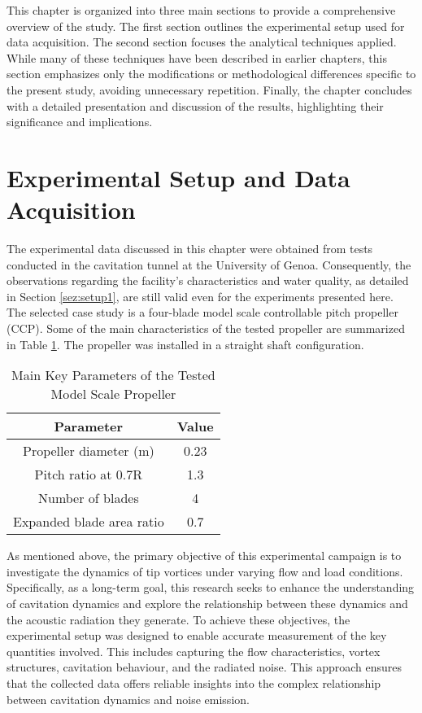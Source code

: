 This chapter is organized into three main sections to provide a comprehensive overview of the study. The first section outlines the experimental setup used for data acquisition. The second section focuses the analytical techniques applied. While many of these techniques have been described in earlier chapters, this section emphasizes only the modifications or methodological differences specific to the present study, avoiding unnecessary repetition. Finally, the chapter concludes with a detailed presentation and discussion of the results, highlighting their significance and implications.

\section{Experimental Setup and Data Acquisition}
\label{sez:setup2}

The experimental data discussed in this chapter were obtained from tests conducted in the cavitation tunnel at the University of Genoa. Consequently, the observations regarding the facility's characteristics and water quality, as detailed in Section \ref{sez:setup1}, are still valid even for the experiments presented here.
The selected case study is a four-blade model scale controllable pitch propeller (CCP). Some of the main characteristics of the tested propeller are summarized in Table \ref{tab:caseStudyFeatures}.
The propeller was installed in a straight shaft configuration.

\begin{table}[h]
    \centering
    \begin{tabular}{cc} 
        \toprule
        \textbf{Parameter} & \textbf{Value} \\ \midrule
        Propeller diameter (m) & 0.23 \\
        Pitch ratio at 0.7R & 1.3 \\
        Number of blades & 4 \\
        Expanded blade area ratio & 0.7 \\ 
        \bottomrule
    \end{tabular}
    \caption{Main Key Parameters of the Tested Model Scale Propeller}
    \label{tab:caseStudyFeatures}
\end{table}

As mentioned above, the primary objective of this experimental campaign is to investigate the dynamics of tip vortices under varying flow and load conditions. 
Specifically, as a long-term goal, this research seeks to enhance the understanding of cavitation dynamics and explore the relationship between these dynamics and the acoustic radiation they generate.
To achieve these objectives, the experimental setup was designed to enable accurate measurement of the key quantities involved. This includes capturing the flow characteristics, vortex structures, cavitation behaviour, and the radiated noise. This approach ensures that the collected data offers reliable insights into the complex relationship between cavitation dynamics and noise emission.

